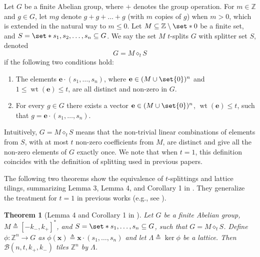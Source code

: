 \documentclass[sort&compress]{elsarticle}
\newcommand{\cB}{\mathcal{B}}
\renewcommand{\leq}{\leqslant}
\newtheorem{theorem}{Theorem}
\newcommand{\Z}{\mathbb{Z}}
\newcommand{\ve}{\mathbf{e}}
\newcommand{\vv}{\mathbf{v}}
\newcommand{\vx}{\mathbf{x}}
\DeclareMathOperator{\wt}{wt}
\newcommand{\kp}{k_+}
\newcommand{\km}{k_-}
\newcommand{\eqdef}{\triangleq}
\newcommand{\splt}{\diamond}
\begin{document}
\begin{definition}
  \label{def:split}
  Let $G$ be a finite Abelian group, where $+$ denotes the group
  operation. For $m\in\Z$ and $g\in G$, let $mg$ denote $g+g+\dots+g$
  (with $m$ copies of $g$) when $m>0$, which is extended in the
  natural way to $m\leq 0$. Let $M\subseteq\Z\setminus\set*{0}$ be a
  finite set, and $S=\set*{s_1,s_2,\dots,s_n}\subseteq G$. We say the
  set $M$ $t$-splits $G$ with splitter set $S$, denoted
  \[G = M\splt_t S\]
  if the following two conditions hold:
  \begin{enumerate}
  \item
    The elements $\ve\cdot (s_1,\dots,s_n)$, where $\ve\in
    (M\cup\set{0})^n$ and $1\leq \wt(\ve)\leq t$, are all distinct and
    non-zero in $G$.
  \item
    For every $g\in G$ there exists a vector $\ve\in
    (M\cup\set{0})^n$, $\wt(\ve)\leq t$, such that $g=\ve\cdot
    (s_1,\dots,s_n)$.
  \end{enumerate}
\end{definition}

Intuitively, $G=M\splt_t S$ means that the non-trivial linear
combinations of elements from $S$, with at most $t$ non-zero
coefficients from $M$, are distinct and give all the non-zero elements
of $G$ exactly once. We note that when $t=1$, this definition
coincides with the definition of splitting used in previous papers.

The following two theorems show the equivalence of $t$-splittings and
lattice tilings, summarizing Lemma 3, Lemma 4, and Corollary 1
in \cite{BuzEtz12}. They generalize the treatment for $t=1$ in previous
works (e.g., see \cite{SteSza94}).

\begin{theorem}[Lemma 4 and Corollary 1 in \cite{BuzEtz12}]
  \label{th:lattotile}
  Let $G$ be a finite Abelian group, $M\eqdef [-\km,\kp]^*$, and
  $S=\set*{s_1,\dots,s_n}\subseteq G$, such that $G = M\splt_t
  S$. Define $\phi:\Z^n\to G$ as
  $\phi(\vx)\eqdef\vx\cdot(s_1,\dots,s_n)$ and let
  $\Lambda\eqdef\ker\phi$ be a lattice. Then $\cB(n,t,\kp,\km)$ tiles
  $\Z^n$ by $\Lambda$.
\end{theorem}
\end{document}
